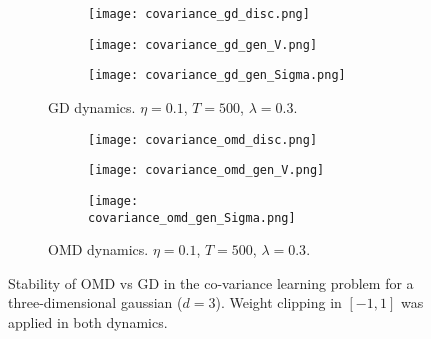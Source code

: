 \begin{figure}[H]
    \centering
    \begin{subfigure}[b]{1\textwidth}
        \centering
    		\begin{subfigure}[b]{.3\textwidth}
    		\texttt{[image: covariance\_gd\_disc.png]}
			\end{subfigure}        
    		\begin{subfigure}[b]{.3\textwidth}
    		\texttt{[image: covariance\_gd\_gen\_V.png]}
			\end{subfigure}        
    		\begin{subfigure}[b]{.3\textwidth}
    		\texttt{[image: covariance\_gd\_gen\_Sigma.png]}
			\end{subfigure}        
        \caption{GD dynamics. $\eta=0.1$, $T=500$, $\lambda=0.3$.}
    \end{subfigure}
    \begin{subfigure}[b]{1\textwidth}
        \centering
    		\begin{subfigure}[b]{.3\textwidth}
    		\texttt{[image: covariance\_omd\_disc.png]}
			\end{subfigure}        
    		\begin{subfigure}[b]{.3\textwidth}
    		\texttt{[image: covariance\_omd\_gen\_V.png]}
			\end{subfigure}        
    		\begin{subfigure}[b]{.3\textwidth}
    		\texttt{[image: covariance\_omd\_gen\_Sigma.png]}
			\end{subfigure}        
        \caption{OMD dynamics. $\eta=0.1$, $T=500$, $\lambda=0.3$.}
    \end{subfigure}
    \caption{Stability of OMD vs GD in the co-variance learning problem for a three-dimensional gaussian ($d=3$). Weight clipping in $[-1,1]$ was applied in both dynamics.}\label{fig:covariance}
\end{figure}

\newpage

